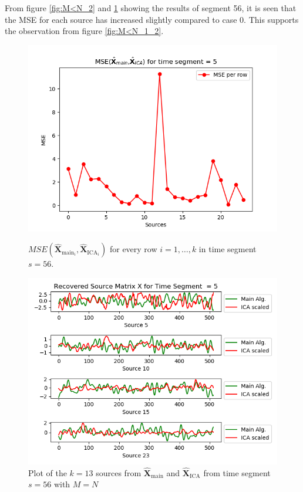 \noindent 
From figure \ref{fig:M<N_2} and \ref{fig:M<N_3} showing the results of segment 56, it is seen that the MSE for each source has increased slightly compared to case 0. This supports the observation from figure \ref{fig:M<N_1_2}.      
\begin{figure}[H]
\begin{widepage}
    \begin{minipage}[t]{.45\textwidth}
\centering
\includegraphics[width=1\linewidth]{figures/ch_7/resultat/mse_third_removed_ica_timeseg5.png}
\caption{$MSE\left(\hat{\mathbf{X}}_{\text{main}_{i}},\hat{\mathbf{X}}_{\text{ICA}_{i}}\right)$ for every row $i = 1, \hdots, k$ in time segment $s=56$.}
\label{fig:M<N_2}
\end{minipage} 
\hspace{0.5cm}
\begin{minipage}[t]{.45\textwidth}
\centering
\includegraphics[width=1\linewidth]{figures/ch_7/resultat/EEG_third_removed_scaled_timeseg5S1_CClean.png}
\caption{Plot of the $k = 13$ sources from $\hat{\mathbf{X}}_{\text{main}}$ and $\hat{\mathbf{X}}_{\text{ICA}}$ from time segment $s = 56$ with $M=N$}
	\label{fig:M<N_3}
    \end{minipage}
\end{widepage}
\end{figure}
